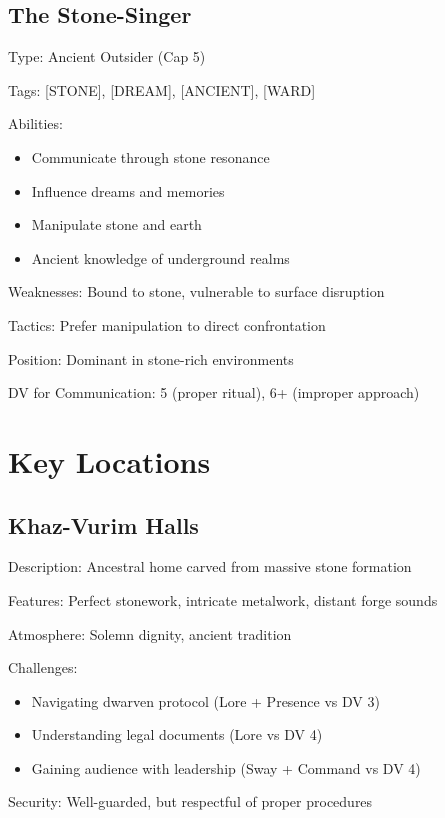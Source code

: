 \documentclass[11pt]{article}
\newenvironment{npc}[1]{\begin{description}[leftmargin=*,style=standard]\item[\textbf{#1}]}{\end{description}}
\newenvironment{location}[1]{\begin{description}[leftmargin=*,style=standard]\item[\textbf{#1}]}{\end{description}}
\begin{document}
\subsection{The Stone-Singer}
\begin{npc}{The Stone-Singer}
\item[Type:] Ancient Outsider (Cap 5)
\item[Tags:] [STONE], [DREAM], [ANCIENT], [WARD]
\item[Abilities:] 
  \begin{itemize}
    \item Communicate through stone resonance
    \item Influence dreams and memories
    \item Manipulate stone and earth
    \item Ancient knowledge of underground realms
  \end{itemize}
\item[Weaknesses:] Bound to stone, vulnerable to surface disruption
\item[Tactics:] Prefer manipulation to direct confrontation
\item[Position:] Dominant in stone-rich environments
\item[DV for Communication:] 5 (proper ritual), 6+ (improper approach)
\end{npc}

\section{Key Locations}

\subsection{Khaz-Vurim Halls}
\begin{location}{Khaz-Vurim Halls}
\item[Description:] Ancestral home carved from massive stone formation
\item[Features:] Perfect stonework, intricate metalwork, distant forge sounds
\item[Atmosphere:] Solemn dignity, ancient tradition
\item[Challenges:] 
  \begin{itemize}
    \item Navigating dwarven protocol (Lore + Presence vs DV 3)
    \item Understanding legal documents (Lore vs DV 4)
    \item Gaining audience with leadership (Sway + Command vs DV 4)
  \end{itemize}
\item[Security:] Well-guarded, but respectful of proper procedures
\end{location}
\end{document}

